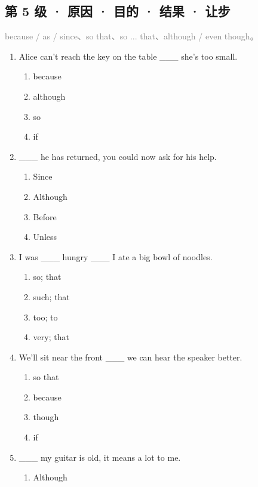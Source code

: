 \documentclass[11pt,a4paper]{ctexart}
\begin{document}
\subsection*{第 5 级 · 原因 · 目的 · 结果 · 让步}
\noindent\textcolor{gray}{because / as / since、so that、so ... that、although / even though。}\par\smallskip
\begin{enumerate}[leftmargin=*,itemsep=4pt]
\item Alice can’t reach the key on the table \_\_\_ she’s too small.
\begin{enumerate}[label=\Alph*.,leftmargin=2em,itemsep=1pt,topsep=2pt]
\item because
\item although
\item so
\item if
\end{enumerate}
\item \_\_\_ he has returned, you could now ask for his help.
\begin{enumerate}[label=\Alph*.,leftmargin=2em,itemsep=1pt,topsep=2pt]
\item Since
\item Although
\item Before
\item Unless
\end{enumerate}
\item I was \_\_\_ hungry \_\_\_ I ate a big bowl of noodles.
\begin{enumerate}[label=\Alph*.,leftmargin=2em,itemsep=1pt,topsep=2pt]
\item so; that
\item such; that
\item too; to
\item very; that
\end{enumerate}
\item We’ll sit near the front \_\_\_ we can hear the speaker better.
\begin{enumerate}[label=\Alph*.,leftmargin=2em,itemsep=1pt,topsep=2pt]
\item so that
\item because
\item though
\item if
\end{enumerate}
\item \_\_\_ my guitar is old, it means a lot to me.
\begin{enumerate}[label=\Alph*.,leftmargin=2em,itemsep=1pt,topsep=2pt]
\item Although

\end{enumerate}
\end{enumerate}
\end{document}
